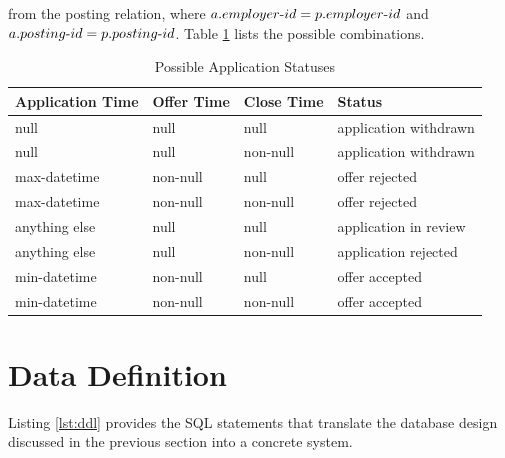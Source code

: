 \documentclass{article}
\newcommand{\tdash}{\textnormal{-}}
\begin{document}
            from the posting relation, where $a.employer \tdash id = p.employer \tdash id$ and $a.posting \tdash id =
            p.posting \tdash id$. Table \ref{tab:app_status} lists the possible combinations.
            \begin{table}[h]
                \centering
                \begin{tabular}{|l|l|l|l|}
                    \hline
                    \textbf{Application Time} & \textbf{Offer Time} & \textbf{Close Time} & \textbf{Status}       \\ \hline
                    null                      & null                & null                & application withdrawn \\ \hline
                    null                      & null                & non-null            & application withdrawn \\ \hline
                    max-datetime              & non-null            & null                & offer rejected        \\ \hline
                    max-datetime              & non-null            & non-null            & offer rejected        \\ \hline
                    anything else             & null                & null                & application in review \\ \hline
                    anything else             & null                & non-null            & application rejected  \\ \hline
                    min-datetime              & non-null            & null                & offer accepted        \\ \hline
                    min-datetime              & non-null            & non-null            & offer accepted        \\ \hline
                \end{tabular}
                \caption{Possible Application Statuses}
                \label{tab:app_status}
            \end{table}
    \section{Data Definition}
        Listing \ref{lst:ddl} provides the SQL statements that translate the database design discussed in the previous
        section into a concrete system. 
\end{document}
